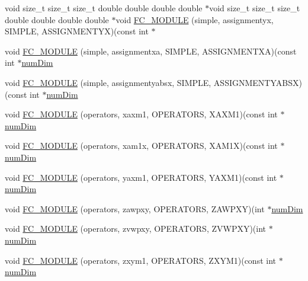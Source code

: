 \begin{DoxyCompactItemize}
\item 
void size\+\_\+t size\+\_\+t size\+\_\+t double double double double $\ast$void size\+\_\+t size\+\_\+t size\+\_\+t double double double double $\ast$void \hyperlink{SimpleKernels_8H_a915edc4c95b0163b19b9ec4becea388c}{F\+C\+\_\+\+M\+O\+D\+U\+LE} (simple, assignmentyx, S\+I\+M\+P\+LE, A\+S\+S\+I\+G\+N\+M\+E\+N\+T\+YX)(const int $\ast$
\item 
void \hyperlink{SimpleKernels_8H_a3e326b2ac2126aa38be4c6e364780b38}{F\+C\+\_\+\+M\+O\+D\+U\+LE} (simple, assignmentxa, S\+I\+M\+P\+LE, A\+S\+S\+I\+G\+N\+M\+E\+N\+T\+XA)(const int $\ast$\hyperlink{SATKernels_8H_a680185db8546de161968dabace9e94f1}{num\+Dim}
\item 
void \hyperlink{SimpleKernels_8H_a162b3777d02b99a56baf2bd336c29add}{F\+C\+\_\+\+M\+O\+D\+U\+LE} (simple, assignmentyabsx, S\+I\+M\+P\+LE, A\+S\+S\+I\+G\+N\+M\+E\+N\+T\+Y\+A\+B\+SX)(const int $\ast$\hyperlink{SATKernels_8H_a680185db8546de161968dabace9e94f1}{num\+Dim}
\item 
void \hyperlink{SimpleKernels_8H_a41e21d5abb0bcb5ae87c4be453ec7ba1}{F\+C\+\_\+\+M\+O\+D\+U\+LE} (operators, xaxm1, O\+P\+E\+R\+A\+T\+O\+RS, X\+A\+X\+M1)(const int $\ast$\hyperlink{SATKernels_8H_a680185db8546de161968dabace9e94f1}{num\+Dim}
\item 
void \hyperlink{SimpleKernels_8H_ac0a73053cd8988d79de0d96354644410}{F\+C\+\_\+\+M\+O\+D\+U\+LE} (operators, xam1x, O\+P\+E\+R\+A\+T\+O\+RS, X\+A\+M1X)(const int $\ast$\hyperlink{SATKernels_8H_a680185db8546de161968dabace9e94f1}{num\+Dim}
\item 
void \hyperlink{SimpleKernels_8H_a2223338825b7642dc136c18c6b14b217}{F\+C\+\_\+\+M\+O\+D\+U\+LE} (operators, yaxm1, O\+P\+E\+R\+A\+T\+O\+RS, Y\+A\+X\+M1)(const int $\ast$\hyperlink{SATKernels_8H_a680185db8546de161968dabace9e94f1}{num\+Dim}
\item 
void \hyperlink{SimpleKernels_8H_affde392e3244efb447613ef9c6f722b1}{F\+C\+\_\+\+M\+O\+D\+U\+LE} (operators, zawpxy, O\+P\+E\+R\+A\+T\+O\+RS, Z\+A\+W\+P\+XY)(int $\ast$\hyperlink{SATKernels_8H_a680185db8546de161968dabace9e94f1}{num\+Dim}
\item 
void \hyperlink{SimpleKernels_8H_a0c8508a474c666c3dc565736b6549623}{F\+C\+\_\+\+M\+O\+D\+U\+LE} (operators, zvwpxy, O\+P\+E\+R\+A\+T\+O\+RS, Z\+V\+W\+P\+XY)(int $\ast$\hyperlink{SATKernels_8H_a680185db8546de161968dabace9e94f1}{num\+Dim}
\item 
void \hyperlink{SimpleKernels_8H_adc4801661a9b1ab74d8a42cbe59fb78a}{F\+C\+\_\+\+M\+O\+D\+U\+LE} (operators, zxym1, O\+P\+E\+R\+A\+T\+O\+RS, Z\+X\+Y\+M1)(const int $\ast$\hyperlink{SATKernels_8H_a680185db8546de161968dabace9e94f1}{num\+Dim}
\end{DoxyCompactItemize}
